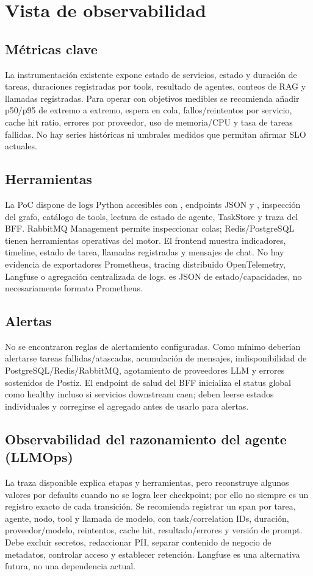 \documentclass[12pt,oneside]{report}
\newcommand{\code}[1]{\texttt{\detokenize{#1}}}
\begin{document}
\section{Vista de observabilidad}

\subsection{Métricas clave}
La instrumentación existente expone estado de servicios, estado y duración de tareas, duraciones registradas por tools, resultado de agentes, conteos de RAG y llamadas registradas. Para operar con objetivos medibles se recomienda añadir p50/p95 de extremo a extremo, espera en cola, fallos/reintentos por servicio, cache hit ratio, errores por proveedor, uso de memoria/CPU y tasa de tareas fallidas. No hay series históricas ni umbrales medidos que permitan afirmar SLO actuales.

\subsection{Herramientas}
La PoC dispone de logs Python accesibles con \code{docker compose logs}, endpoints JSON \code{/health} y \code{/metrics}, inspección del grafo, catálogo de tools, lectura de estado de agente, TaskStore y traza del BFF. RabbitMQ Management permite inspeccionar colas; Redis/PostgreSQL tienen herramientas operativas del motor. El frontend muestra indicadores, timeline, estado de tarea, llamadas registradas y mensajes de chat. No hay evidencia de exportadores Prometheus, tracing distribuido OpenTelemetry, Langfuse o agregación centralizada de logs. \code{/metrics} es JSON de estado/capacidades, no necesariamente formato Prometheus.

\subsection{Alertas}
No se encontraron reglas de alertamiento configuradas. Como mínimo deberían alertarse tareas fallidas/atascadas, acumulación de mensajes, indisponibilidad de PostgreSQL/Redis/RabbitMQ, agotamiento de proveedores LLM y errores sostenidos de Postiz. El endpoint de salud del BFF inicializa el status global como healthy incluso si servicios downstream caen; deben leerse estados individuales y corregirse el agregado antes de usarlo para alertas.

\subsection{Observabilidad del razonamiento del agente (LLMOps)}
La traza disponible explica etapas y herramientas, pero reconstruye algunos valores por defaults cuando no se logra leer checkpoint; por ello no siempre es un registro exacto de cada transición. Se recomienda registrar un span por tarea, agente, nodo, tool y llamada de modelo, con task/correlation IDs, duración, proveedor/modelo, reintentos, cache hit, resultado/errores y versión de prompt. Debe excluir secretos, redaccionar PII, separar contenido de negocio de metadatos, controlar acceso y establecer retención. Langfuse es una alternativa futura, no una dependencia actual.
\end{document}
